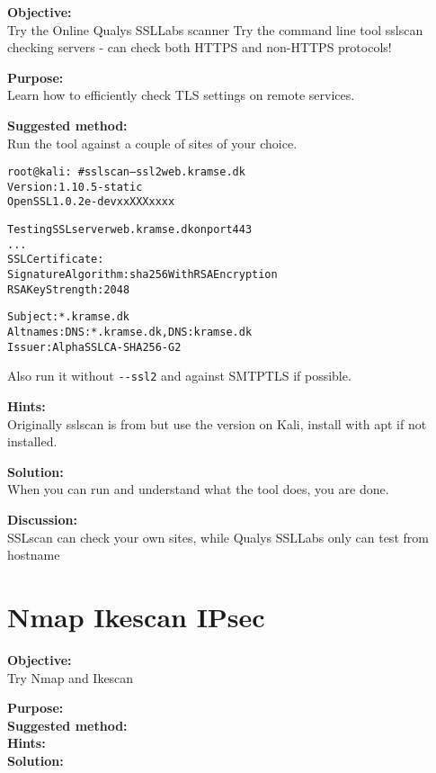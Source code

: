 \documentclass[a4paper,11pt,notitlepage]{report}
\begin{document}
{\bf Objective:}\\
Try the Online Qualys SSLLabs scanner 
Try the command line tool sslscan checking servers - can check both HTTPS and non-HTTPS protocols!

{\bf Purpose:}\\
Learn how to efficiently check TLS settings on remote services.

{\bf Suggested method:}\\
Run the tool against a couple of sites of your choice.

\begin{alltt}\small
root@kali:~# sslscan --ssl2 web.kramse.dk
Version: 1.10.5-static
OpenSSL 1.0.2e-dev xx XXX xxxx

Testing SSL server web.kramse.dk on port 443
...
  SSL Certificate:
Signature Algorithm: sha256WithRSAEncryption
RSA Key Strength:    2048

Subject:  *.kramse.dk
Altnames: DNS:*.kramse.dk, DNS:kramse.dk
Issuer:   AlphaSSL CA - SHA256 - G2
\end{alltt}

Also run it without \verb+--ssl2+ and against SMTPTLS if possible.

{\bf Hints:}\\
Originally sslscan is from  but use the version on Kali, install with apt if not installed.

{\bf Solution:}\\
When you can run and understand what the tool does, you are done.

{\bf Discussion:}\\
SSLscan can check your own sites, while Qualys SSLLabs only can test from hostname



\chapter{Nmap Ikescan IPsec}
\label{ex:nmap-ikescan}

{\bf Objective:}\\
Try Nmap and Ikescan

{\bf Purpose:}\\


{\bf Suggested method:}\\


{\bf Hints:}\\


{\bf Solution:}\\
\end{document}
